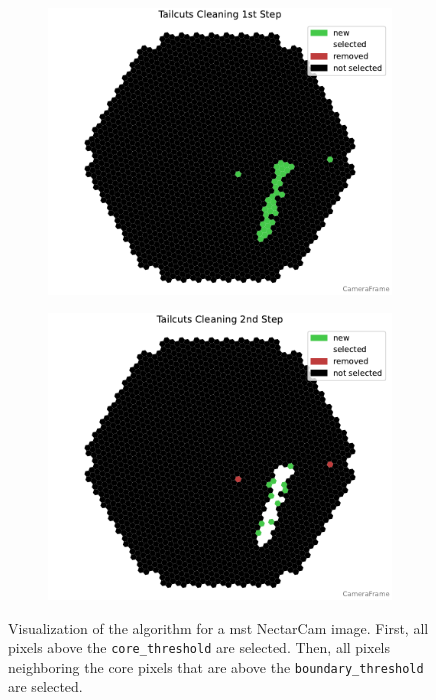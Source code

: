 \begin{figure}
    \centering
    \begin{subfigure}[t]{0.33\textwidth}
        \includegraphics[width=\textwidth]{plots/cleaner_steps/tail_1.pdf}
    \end{subfigure}
    \begin{subfigure}[t]{0.33\textwidth}
        \includegraphics[width=\textwidth]{plots/cleaner_steps/tail_2.pdf}
    \end{subfigure}
    \caption{Visualization of the \tailcuts{} algorithm for a \gls{mst} NectarCam image. First, all
    pixels above the \texttt{core\_threshold} are selected. Then, all pixels neighboring the core
    pixels that are above the \texttt{boundary\_threshold} are selected.}
    \label{fig:tailcuts_clean}
\end{figure}

